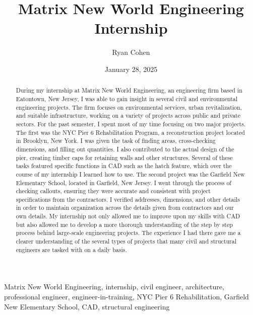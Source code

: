 \documentclass[12pt,conference,onecolumn]{IEEEtran}
\title{Matrix New World Engineering Internship}
\author{Ryan Cohen}
\date{January 28, 2025}
\begin{document}
\maketitle 

\begin{abstract}
During my internship at Matrix New World Engineering, an engineering firm based in Eatontown, New Jersey, I was able to gain insight in several civil and environmental engineering projects. The firm focuses on environmental services, urban revitalization, and suitable infrastructure, working on a variety of projects across public and private sectors. For the past semester, I spent most of my time focusing on two major projects. The first was the NYC Pier 6 Rehabilitation Program, a reconstruction project located in Brooklyn, New York. I was given the task of finding areas, cross-checking dimensions, and filling out quantities. I also contributed to the actual design of the pier, creating timber caps for retaining walls and other structures. Several of these tasks featured specific functions in CAD such as the hatch feature, which over the course of my internship I learned how to use. The second project was the Garfield New Elementary School, located in Garfield, New Jersey. I went through the process of checking callouts, ensuring they were accurate and consistent with project specifications from the contractors. I verified addresses, dimensions, and other details in order to maintain organization across the details given from contractors and our own details. My internship not only allowed me to improve upon my skills with CAD but also allowed me to develop a more thorough understanding of the step by step process behind large-scale engineering projects. The experience I had there gave me a clearer understanding of the several types of projects that many civil and structural engineers are tasked with on a daily basis.
\end{abstract}

\begin{IEEEkeywords}
Matrix New World Engineering, internship, civil engineer, architecture, professional engineer, engineer-in-training, NYC Pier 6 Rehabilitation, Garfield New Elementary School, CAD, structural engineering
\end{IEEEkeywords}
\end{document}
